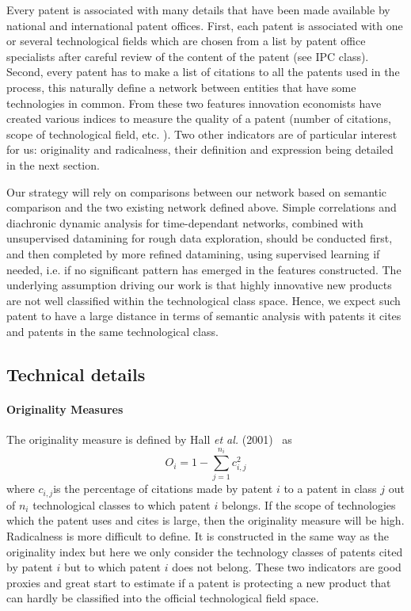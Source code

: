 Every patent is associated with many details that have been made available by national and international patent offices. First, each patent is associated with one or several technological fields which are chosen from a list by patent office specialists after careful review of the content of the patent (see IPC class). Second, every patent has to make a list of citations to all the patents used in the process, this naturally define a network between entities that have some technologies in common. From these two features innovation economists have created various indices to measure the quality of a patent (number of citations, scope of technological field, etc. ). Two other indicators are of particular interest for us: originality and radicalness, their definition and expression being detailed in the next section.

Our strategy will rely on comparisons between our network based on semantic comparison and the two existing network defined above. Simple correlations and diachronic dynamic analysis for time-dependant networks, combined with unsupervised datamining for rough data exploration, should be conducted first, and then completed by more refined datamining, using supervised learning if needed, i.e. if no significant pattern has emerged in the features constructed.
The underlying assumption driving our work is that highly innovative new products are not well classified within the technological class space. %
Hence, we expect such patent to have a large distance in terms of semantic analysis with patents it cites and patents in the same technological class.


\subsection{Technical details}


\paragraph{Originality Measures}

The originality measure is
defined by Hall \textit{et al.} (2001)~\cite{Hall2001} as
\[
O_{i}=1-\sum_{j=1}^{n_{i}}{c_{i,j}^{2}}
\]
where $c_{i,j}$is the percentage of citations made by patent $i$ to a patent in class $j$ out of
$n_{i}$ technological classes to which patent $i$ belongs. If the scope of
technologies which the patent uses and cites is large, then the originality
measure will be high. Radicalness is more difficult to define. It is
constructed in the same way as the originality index but here we only consider
the technology classes of patents cited by patent $i$ but to which patent $i$
does not belong. These two indicators are good proxies and great start to estimate if a patent is protecting a new product that can hardly be classified into the official technological field space.



